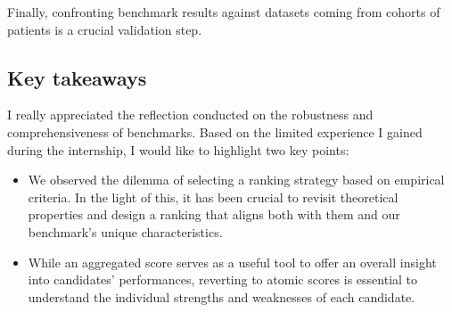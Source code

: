 \documentclass{article}
\begin{document}
Finally, confronting benchmark results against datasets coming from cohorts of patients is a crucial validation step. 

\subsection{Key takeaways}

I really appreciated the reflection conducted on the robustness and comprehensiveness of benchmarks.
Based on the limited experience I gained during the internship, I would like to highlight two key points:
\begin{itemize}
    \item We observed the dilemma of selecting a ranking strategy based on empirical criteria.
    In the light of this, it has been crucial to revisit theoretical properties and design a ranking that aligns both with them and our benchmark's unique characteristics.
    \item While an aggregated score serves as a useful tool to offer an overall insight into candidates' performances, reverting to atomic scores is essential to understand the individual strengths and weaknesses of each candidate.
\end{itemize}

\clearpage

\printbibliography[heading=bibintoc,title={References}]

\clearpage

\setlength{\headsep}{0pt}
\appendix
\end{document}
